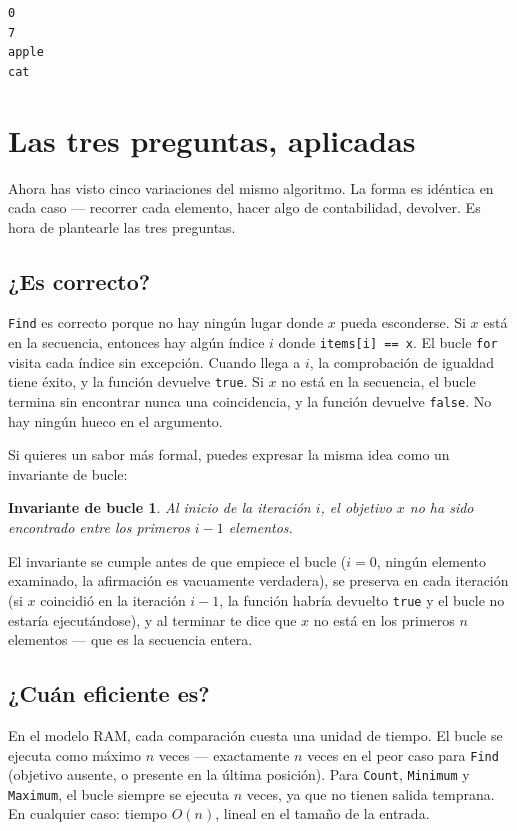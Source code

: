 \documentclass[11pt,a4paper]{article}
\newtheorem{invariante}{Invariante de bucle}
\begin{document}
\begin{verbatim}
0
7
apple
cat
\end{verbatim}

\section{Las tres preguntas, aplicadas}

Ahora has visto cinco variaciones del mismo algoritmo. La forma es idéntica en cada caso --- recorrer cada elemento, hacer algo de contabilidad, devolver. Es hora de plantearle las tres preguntas.

\subsection*{¿Es correcto?}

\texttt{Find} es correcto porque no hay ningún lugar donde $x$ pueda esconderse. Si $x$ está en la secuencia, entonces hay algún índice $i$ donde \texttt{items[i] == x}. El bucle \texttt{for} visita cada índice sin excepción. Cuando llega a $i$, la comprobación de igualdad tiene éxito, y la función devuelve \texttt{true}. Si $x$ no está en la secuencia, el bucle termina sin encontrar nunca una coincidencia, y la función devuelve \texttt{false}. No hay ningún hueco en el argumento.

Si quieres un sabor más formal, puedes expresar la misma idea como un invariante de bucle:

\begin{invariante}
Al inicio de la iteración $i$, el objetivo $x$ no ha sido encontrado entre los primeros $i-1$ elementos.
\end{invariante}

El invariante se cumple antes de que empiece el bucle ($i = 0$, ningún elemento examinado, la afirmación es vacuamente verdadera), se preserva en cada iteración (si $x$ coincidió en la iteración $i-1$, la función habría devuelto \texttt{true} y el bucle no estaría ejecutándose), y al terminar te dice que $x$ no está en los primeros $n$ elementos --- que es la secuencia entera.

\subsection*{¿Cuán eficiente es?}

En el modelo RAM, cada comparación cuesta una unidad de tiempo. El bucle se ejecuta como máximo $n$ veces --- exactamente $n$ veces en el peor caso para \texttt{Find} (objetivo ausente, o presente en la última posición). Para \texttt{Count}, \texttt{Minimum} y \texttt{Maximum}, el bucle siempre se ejecuta $n$ veces, ya que no tienen salida temprana. En cualquier caso: tiempo $O(n)$, lineal en el tamaño de la entrada.
\end{document}
